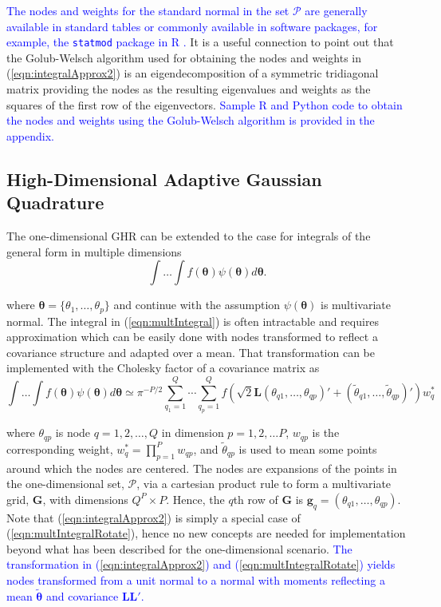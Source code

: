 \documentclass[12pt]{article}
\begin{document}
\textcolor{blue}{The nodes and weights for the standard normal in the set $\mathcal{P}$ are generally available in standard tables \cite{mabramowitz64:handbook} or commonly available in software packages, for example, the \texttt{statmod} package in R \cite{RJ-2016-024}.} It is a useful connection to point out that the Golub-Welsch algorithm \cite{golub} used for obtaining the nodes and weights in (\ref{eqn:integralApprox2}) is an eigendecomposition of a symmetric tridiagonal matrix providing the nodes as the resulting eigenvalues and weights as the squares of the first row of the eigenvectors. \textcolor{blue}{Sample R and Python code to obtain the nodes and weights using the Golub-Welsch algorithm is provided in the appendix.}

\subsection*{High-Dimensional Adaptive Gaussian Quadrature}

The one-dimensional GHR can be extended to the case for integrals of the general form in multiple dimensions 
\begin{equation}
\label{eqn:multIntegral}
\int \ldots \int f(\bm{\theta}) \psi(\bm{\theta}) d\bm{\theta}.
\end{equation}

\noindent where $\bm{\theta} = \{\theta_{1}, \ldots, \theta_{p}\}$ and continue with the assumption $\psi(\bm{\theta})$ is multivariate normal. The integral in (\ref{eqn:multIntegral}) is often intractable and requires approximation which can be easily done with nodes transformed to reflect a covariance structure and adapted over a mean. That transformation can be implemented with the Cholesky factor of a covariance matrix as \cite{chowdhary,jackel,judd,stringer} 
\begin{equation}
\label{eqn:multIntegralRotate}
\int \ldots \int f(\bm{\theta})\psi(\bm{\theta}) d\bm{\theta}  \simeq  \pi^{-P/2}\sum_{q_1=1}^{Q} \cdots \sum_{q_p=1}^{Q} f(\sqrt{2}\bm{L}(\theta_{q1}, \ldots, \theta_{qp})' + (\widetilde{\theta}_{q1}, \ldots, \widetilde{\theta}_{qp})')w_q^*
\end{equation}
 
\noindent where $\theta_{qp}$ is node $q = 1, 2, \ldots, Q$ in dimension $p = 1,2, \ldots P$, $w_{qp}$ is the corresponding weight, $w_q^* = \prod^P_{p=1}w_{qp}$, and $\widetilde{\theta}_{qp}$ is used to mean some points around which the nodes are centered. The nodes are expansions of the points in the one-dimensional set, $\mathcal{P}$, via a cartesian product rule to form a multivariate grid, $\bm{G}$, with dimensions $Q^P\times P$. Hence, the $q$th row of $\bm{G}$ is $\bm{g}_q = (\theta_{q1}, \ldots, \theta_{qp})$.  Note that (\ref{eqn:integralApprox2}) is simply a special case of (\ref{eqn:multIntegralRotate}), hence no new concepts are needed for implementation beyond what has been described for the one-dimensional scenario. \textcolor{blue}{The transformation in (\ref{eqn:integralApprox2}) and (\ref{eqn:multIntegralRotate}) yields nodes transformed from a unit normal to a normal with moments reflecting a mean $\widetilde{\bm{\theta}}$ and covariance $\bm{LL}'$.}
\end{document}
